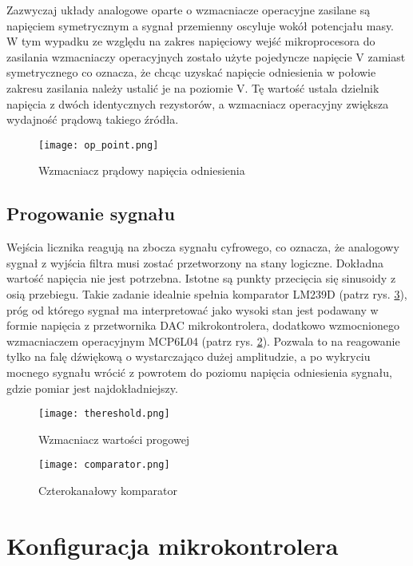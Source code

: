 Zazwyczaj układy analogowe oparte o wzmacniacze operacyjne zasilane są napięciem symetrycznym a sygnał przemienny oscyluje wokół potencjału masy. 
W tym wypadku ze względu na zakres napięciowy wejść mikroprocesora do zasilania wzmacniaczy operacyjnych 
zostało użyte pojedyncze napięcie \unit[3,3]{V} zamiast symetrycznego co oznacza, 
że chcąc uzyskać napięcie odniesienia w połowie zakresu zasilania należy ustalić je na poziomie \unit[1,65]{V}. 
Tę wartość ustala dzielnik napięcia z dwóch identycznych rezystorów,
a wzmacniacz operacyjny zwiększa wydajność prądową takiego źródła. 
\begin{figure}[ht!]
    \centering
    \texttt{[image: op\_point.png]}
    \caption{Wzmacniacz prądowy napięcia odniesienia}
    \label{fig:op_point}
\end{figure}

\subsection{Progowanie sygnału}
Wejścia licznika reagują na zbocza sygnału cyfrowego, co oznacza, że analogowy sygnał z wyjścia filtra musi zostać przetworzony na stany logiczne.
Dokładna wartość napięcia nie jest potrzebna. Istotne są punkty przecięcia się sinusoidy z osią przebiegu.
Takie zadanie idealnie spełnia komparator LM239D (patrz rys. \ref{fig:comparator}), próg od którego sygnał ma interpretować jako wysoki stan jest podawany w formie 
napięcia z przetwornika DAC mikrokontrolera, dodatkowo wzmocnionego wzmacniaczem operacyjnym MCP6L04 (patrz rys. \ref{fig:thereshold}).
Pozwala to na reagowanie tylko na falę dźwiękową o wystarczająco dużej amplitudzie, 
a po wykryciu mocnego sygnału wrócić z powrotem do poziomu napięcia odniesienia sygnału, gdzie pomiar jest najdokładniejszy.

\begin{figure}[ht!]
    \centering
    \texttt{[image: thereshold.png]}
    \caption{Wzmacniacz wartości progowej}
    \label{fig:thereshold}
\end{figure}

\begin{figure}[ht!]
    \centering
    \texttt{[image: comparator.png]}
    \caption{Czterokanałowy komparator}
    \label{fig:comparator}
\end{figure}

\section{Konfiguracja mikrokontrolera}

